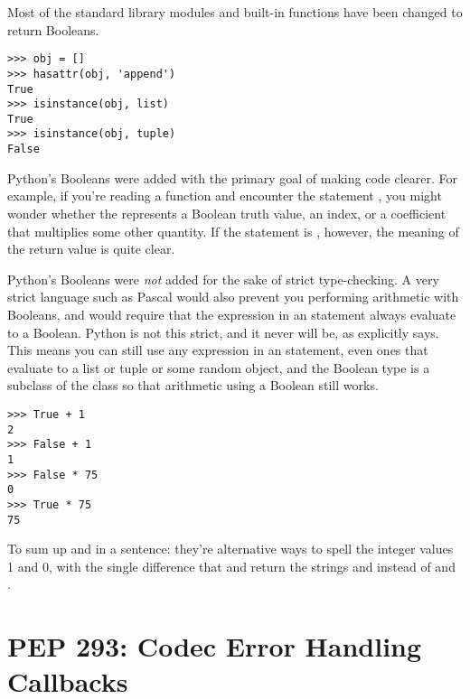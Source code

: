 \documentclass{howto}
\begin{document}
Most of the standard library modules and built-in functions have been
changed to return Booleans.

\begin{verbatim}
>>> obj = []
>>> hasattr(obj, 'append')
True
>>> isinstance(obj, list)
True
>>> isinstance(obj, tuple)
False
\end{verbatim}

Python's Booleans were added with the primary goal of making code
clearer.  For example, if you're reading a function and encounter the
statement , you might wonder whether the 
represents a Boolean truth value, an index, or a
coefficient that multiplies some other quantity.  If the statement is
, however, the meaning of the return value is quite
clear.

Python's Booleans were \emph{not} added for the sake of strict
type-checking.  A very strict language such as Pascal would also
prevent you performing arithmetic with Booleans, and would require
that the expression in an  statement always evaluate to a
Boolean.  Python is not this strict, and it never will be, as
 explicitly says.  This means you can still use any
expression in an  statement, even ones that evaluate to a
list or tuple or some random object, and the Boolean type is a
subclass of the  class so that arithmetic using a Boolean
still works.

\begin{verbatim}
>>> True + 1
2
>>> False + 1
1
>>> False * 75
0
>>> True * 75
75
\end{verbatim}

To sum up  and  in a sentence: they're
alternative ways to spell the integer values 1 and 0, with the single
difference that  and  return the
strings  and  instead of  and
.

\begin{seealso}


\end{seealso}


\section{PEP 293: Codec Error Handling Callbacks}
\end{document}
